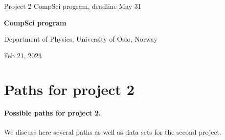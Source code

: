 \documentclass[%
oneside,                 %
final,                   %
10pt]{article}
\begin{document}

\newcommand{\exercisesection}[1]{\subsection*{#1}}






\thispagestyle{empty}

\begin{center}
{\LARGE\bf
\begin{spacing}{1.25}
Project 2 CompSci program, deadline May 31
\end{spacing}
}
\end{center}


\begin{center}
{\bf CompSci program}
\end{center}

    \begin{center}
\centerline{{\small Department of Physics, University of Oslo, Norway}}
\end{center}
    

\begin{center}
Feb 21, 2023
\end{center}

\vspace{1cm}


\section*{Paths for project 2}

\paragraph{Possible paths for project 2.}
We discuss here several paths as well as data sets for the second project.
\end{document}
